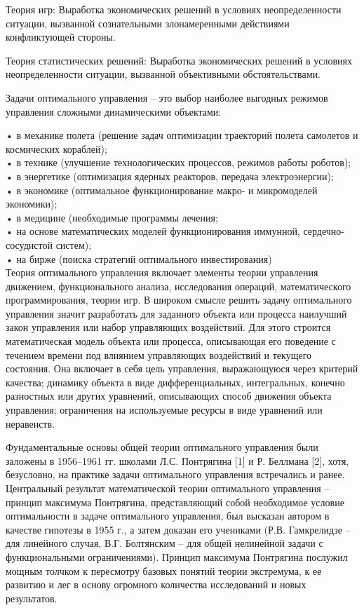 Теория игр: Выработка экономических решений в условиях неопределенности ситуации, вызванной сознательными злонамеренными действиями конфликтующей стороны.


Теория статистических решений: Выработка экономических решений в условиях неопределенности ситуации, вызванной объективными обстоятельствами.


Задачи оптимального управления – это выбор наиболее выгодных режимов управления сложными динамическими объектами:


•	в механике полета (решение задач оптимизации траекторий полета самолетов и космических кораблей);\\
•	в технике (улучшение технологических процессов, режимов работы роботов);\\
•	в энергетике (оптимизация ядерных реакторов, передача электроэнергии);\\
•	в экономике (оптимальное функционирование макро- и микромоделей экономики);\\
•	в медицине (необходимые программы лечения;\\
•	на основе математических моделей функционирования иммунной, сердечно-сосудистой систем);\\
•	на бирже (поиска стратегий оптимального инвестирования) \\


Теория оптимального управления включает элементы теории управления движением, функционального анализа, исследования операций, математического программирования, теории игр. В широком смысле решить задачу оптимального управления значит разработать для заданного объекта или процесса наилучший закон управления или набор управляющих воздействий. Для этого строится математическая модель объекта или процесса, описывающая его поведение с течением времени под влиянием управляющих воздействий и текущего состояния. Она включает в себя цель управления, выражающуюся через критерий качества; динамику объекта в виде дифференциальных, интегральных, конечно разностных или других уравнений, описывающих способ движения объекта управления; ограничения на используемые ресурсы в виде уравнений или неравенств.


Фундаментальные основы общей теории оптимального управления были заложены в 1956–1961 гг. школами Л.С. Понтрягина [1] и Р. Беллмана [2], хотя, безусловно, на практике задачи оптимального управления встречались и ранее. Центральный результат математической теории оптимального управления – принцип максимума Понтрягина, представляющий собой необходимое условие оптимальности в задаче оптимального управления, был высказан автором в качестве гипотезы в 1955 г., а затем доказан его учениками (Р.В. Гамкрелидзе – для линейного случая, В.Г. Болтянским – для общей нелинейной задачи с функциональными ограничениями). Принцип максимума Понтрягина послужил мощным толчком к пересмотру базовых понятий теории экстремума, к ее развитию и лег в основу огромного количества исследований и новых результатов.


